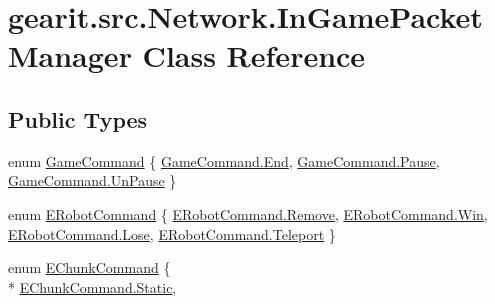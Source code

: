\hypertarget{classgearit_1_1src_1_1_network_1_1_in_game_packet_manager}{\section{gearit.\+src.\+Network.\+In\+Game\+Packet\+Manager Class Reference}
\label{classgearit_1_1src_1_1_network_1_1_in_game_packet_manager}
}
\subsection*{Public Types}
\begin{DoxyCompactItemize}
\item 
enum \hyperlink{classgearit_1_1src_1_1_network_1_1_in_game_packet_manager_a54ffc79273b4a6a85b011c559bd08220}{Game\+Command} \{ \hyperlink{classgearit_1_1src_1_1_network_1_1_in_game_packet_manager_a54ffc79273b4a6a85b011c559bd08220a87557f11575c0ad78e4e28abedc13b6e}{Game\+Command.\+End}, 
\hyperlink{classgearit_1_1src_1_1_network_1_1_in_game_packet_manager_a54ffc79273b4a6a85b011c559bd08220a105b296a83f9c105355403f3332af50f}{Game\+Command.\+Pause}, 
\hyperlink{classgearit_1_1src_1_1_network_1_1_in_game_packet_manager_a54ffc79273b4a6a85b011c559bd08220aae5dcc5251b76cb1655efd2c5698f4af}{Game\+Command.\+Un\+Pause}
 \}
\item 
enum \hyperlink{classgearit_1_1src_1_1_network_1_1_in_game_packet_manager_ae3674f6abcd4c0edf853e4557b2c4fbc}{E\+Robot\+Command} \{ \hyperlink{classgearit_1_1src_1_1_network_1_1_in_game_packet_manager_ae3674f6abcd4c0edf853e4557b2c4fbca1063e38cb53d94d386f21227fcd84717}{E\+Robot\+Command.\+Remove}, 
\hyperlink{classgearit_1_1src_1_1_network_1_1_in_game_packet_manager_ae3674f6abcd4c0edf853e4557b2c4fbca119eac47719cc9be7b99124712e229da}{E\+Robot\+Command.\+Win}, 
\hyperlink{classgearit_1_1src_1_1_network_1_1_in_game_packet_manager_ae3674f6abcd4c0edf853e4557b2c4fbca02cf70d59ed69d7c9dd21d30e490e050}{E\+Robot\+Command.\+Lose}, 
\hyperlink{classgearit_1_1src_1_1_network_1_1_in_game_packet_manager_ae3674f6abcd4c0edf853e4557b2c4fbca054fc7866c93a2496fd9048c493e6aed}{E\+Robot\+Command.\+Teleport}
 \}
\item 
enum \hyperlink{classgearit_1_1src_1_1_network_1_1_in_game_packet_manager_a211d3f59eba6772f7b8abc3260a2e776}{E\+Chunk\+Command} \{ \\*
\hyperlink{classgearit_1_1src_1_1_network_1_1_in_game_packet_manager_a211d3f59eba6772f7b8abc3260a2e776a84a8921b25f505d0d2077aeb5db4bc16}{E\+Chunk\+Command.\+Static}, 

\end{DoxyCompactItemize}
